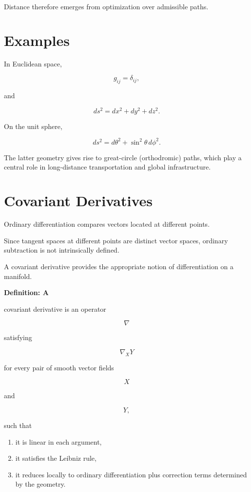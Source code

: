 \documentclass[11pt,fleqn]{book}
\numberwithin{equation}{chapter}
\newenvironment{definition}[1]
  {\begin{definitionEnv}
   \noindent\textbf{Definition: #1}\par\smallskip}
  {\end{definitionEnv}}
\theoremstyle{plain}
\theoremstyle{definition}
\theoremstyle{remark}
\begin{document}
Distance therefore emerges from optimization over admissible paths.


\section{Examples}

In Euclidean space,

\[
g_{ij}
=
\delta_{ij},
\]

and

\[
ds^2
=
dx^2+dy^2+dz^2.
\]

On the unit sphere,

\[
ds^2
=
d\theta^2
+
\sin^2\theta\,d\phi^2.
\]

The latter geometry gives rise to great-circle (orthodromic) paths,
which play a central role in long-distance transportation and global
infrastructure.


\section{Covariant Derivatives}

Ordinary differentiation compares vectors located at different points.

Since tangent spaces at different points are distinct vector spaces,
ordinary subtraction is not intrinsically defined.

A covariant derivative provides the appropriate notion of
differentiation on a manifold.


\begin{definition}

A covariant derivative is an operator

\[
\nabla
\]

satisfying

\[
\nabla_XY
\]

for every pair of smooth vector fields

\[
X
\]

and

\[
Y,
\]

such that

\begin{enumerate}
\item it is linear in each argument,
\item it satisfies the Leibniz rule,
\item it reduces locally to ordinary differentiation plus correction
terms determined by the geometry.
\end{enumerate}

\end{definition}
\end{document}
